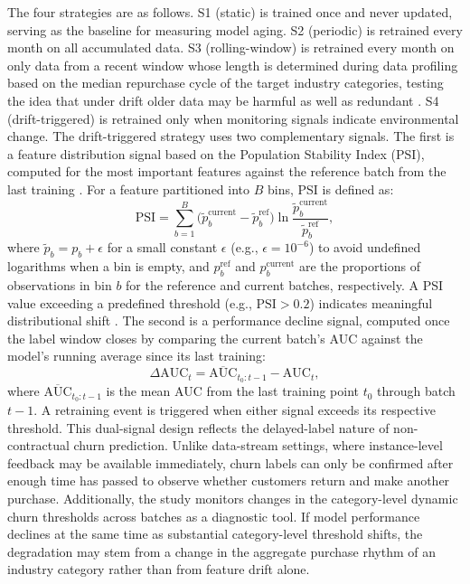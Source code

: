 The four strategies are as follows. S1 (static) is trained once and never updated, serving as the baseline for measuring model aging. S2 (periodic) is retrained every month on all accumulated data. S3 (rolling-window) is retrained every month on only data from a recent window whose length is determined during data profiling based on the median repurchase cycle of the target industry categories, testing the idea that under drift older data may be harmful as well as redundant \cite{zliobaite2010}. S4 (drift-triggered) is retrained only when monitoring signals indicate environmental change. The drift-triggered strategy uses two complementary signals. The first is a feature distribution signal based on the Population Stability Index (PSI), computed for the most important features against the reference batch from the last training \cite{siddiqi2006}. For a feature partitioned into $B$ bins, PSI is defined as:
\begin{equation}
  \text{PSI} = \sum_{b=1}^{B} \bigl(\tilde{p}_b^{\text{current}} - \tilde{p}_b^{\text{ref}}\bigr) \ln \frac{\tilde{p}_b^{\text{current}}}{\tilde{p}_b^{\text{ref}}},
  \label{eq:psi}
\end{equation}
where $\tilde{p}_b = p_b + \epsilon$ for a small constant $\epsilon$ (e.g., $\epsilon = 10^{-6}$) to avoid undefined logarithms when a bin is empty, and $p_b^{\text{ref}}$ and $p_b^{\text{current}}$ are the proportions of observations in bin $b$ for the reference and current batches, respectively. A PSI value exceeding a predefined threshold (e.g., $\text{PSI} > 0.2$) indicates meaningful distributional shift \cite{siddiqi2006}. The second is a performance decline signal, computed once the label window closes by comparing the current batch's AUC against the model's running average since its last training:
\begin{equation}
  \Delta\text{AUC}_t = \overline{\text{AUC}}_{t_0:t-1} - \text{AUC}_t,
  \label{eq:auc-decline}
\end{equation}
where $\overline{\text{AUC}}_{t_0:t-1}$ is the mean AUC from the last training point $t_0$ through batch $t{-}1$. A retraining event is triggered when either signal exceeds its respective threshold. This dual-signal design reflects the delayed-label nature of non-contractual churn prediction. Unlike data-stream settings, where instance-level feedback may be available immediately, churn labels can only be confirmed after enough time has passed to observe whether customers return and make another purchase. Additionally, the study monitors changes in the category-level dynamic churn thresholds across batches as a diagnostic tool. If model performance declines at the same time as substantial category-level threshold shifts, the degradation may stem from a change in the aggregate purchase rhythm of an industry category rather than from feature drift alone.

